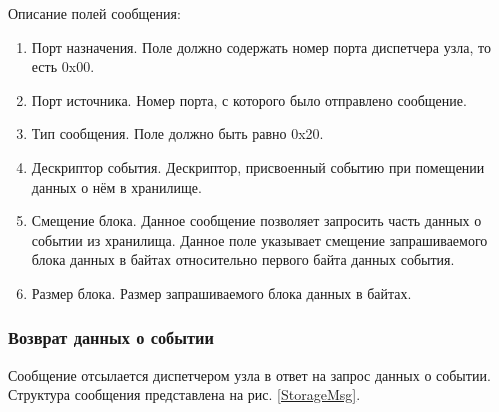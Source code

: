 Описание полей сообщения:
\begin{enumerate}
\item Порт назначения. Поле должно содержать номер порта диспетчера узла, то есть 0x00.
\item Порт источника. Номер порта, с которого было отправлено сообщение.
\item Тип сообщения. Поле должно быть равно 0x20.
\item Дескриптор события. Дескриптор, присвоенный событию при помещении данных о нём в хранилище.
\item Смещение блока. Данное сообщение позволяет запросить часть данных о событии из хранилища.
Данное поле указывает смещение запрашиваемого блока данных в байтах относительно первого байта
данных события.
\item Размер блока. Размер запрашиваемого блока данных в байтах.
\end{enumerate}

\subsubsection{Возврат данных о событии}

Сообщение отсылается диспетчером узла в ответ на запрос данных о событии. Структура сообщения
представлена на рис. \ref{StorageMsg}.

